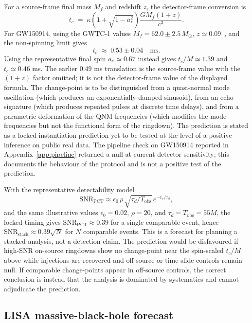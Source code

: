 ﻿\documentclass[12pt,a4paper]{article}
\theoremstyle{definition}
\begin{document}
For a source-frame final mass $M_f$ and redshift $z$, the detector-frame conversion is
\[
t_c \;=\; \kappa\left(1+\sqrt{1-a_\ast^2}\right)\frac{G M_f(1+z)}{c^3}.
\]
For GW150914, using the GWTC-1 values $M_f = 62.0 \pm 2.5\,M_\odot$, $z \simeq 0.09$~\citep{gwtc1}, and the non-spinning limit gives
\[
t_c \;\approx\; 0.53 \pm 0.04 \quad \text{ms}.
\]
Using the representative final spin $a_\ast \simeq 0.67$ instead gives $t_c/M \simeq 1.39$ and $t_c \simeq 0.46$ ms. The earlier $0.49$ ms translation is the source-frame value with the $(1+z)$ factor omitted; it is not the detector-frame value of the displayed formula.
The change-point is to be distinguished from a quasi-normal mode oscillation (which produces an exponentially damped sinusoid), from an echo signature (which produces repeated pulses at discrete time delays), and from a parametric deformation of the QNM frequencies (which modifies the mode frequencies but not the functional form of the ringdown). The prediction is stated as a locked-instantiation prediction yet to be tested at the level of a positive inference on public real data. The pipeline check on GW150914 reported in Appendix~\ref{app:pipeline} returned a null at current detector sensitivity; this documents the behaviour of the protocol and is not a positive test of the prediction.

With the representative detectability model
\[
\mathrm{SNR}_{\mathrm{PCT}}
\approx \epsilon_0\,\rho\,\sqrt{\tau_d/T_{\mathrm{obs}}}\,e^{-t_c/\tau_d},
\]
and the same illustrative values $\epsilon_0=0.02$, $\rho=20$, and $\tau_d=T_{\mathrm{obs}}=55M$, the locked timing gives $\mathrm{SNR}_{\mathrm{PCT}}\approx0.39$ for a single comparable event, hence $\mathrm{SNR}_{\mathrm{stack}}\approx0.39\sqrt{N}$ for $N$ comparable events. This is a forecast for planning a stacked analysis, not a detection claim. The prediction would be disfavoured if high-SNR on-source ringdowns show no change-point near the spin-scaled $t_c/M$ above while injections are recovered and off-source or time-slide controls remain null. If comparable change-points appear in off-source controls, the correct conclusion is instead that the analysis is dominated by systematics and cannot adjudicate the prediction.

\subsection{LISA massive-black-hole forecast}
\label{sec:pred_lisa}
\end{document}
